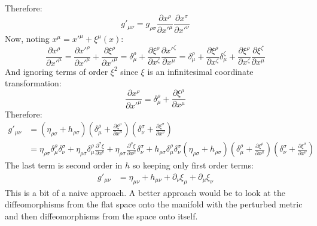 \documentclass[12pt,a4]{article}
\begin{document}
\begin{enumerate}
\begin{enumerate}
\begin{equation*}
        \end{equation*}
        Therefore:
        \begin{equation*}
          g'_{\mu\nu} = g_{\rho \sigma} \frac{\partial x^\rho}{\partial x'^\mu} \frac{\partial x^\sigma}{\partial x'^\nu} 
        \end{equation*}
        Now, noting $x^\mu = x'^\mu + \xi^\mu(x)$:
        \begin{equation*}
          \frac{\partial x^\rho}{\partial x'^\mu} = \frac{\partial x'^\rho}{\partial x'^\mu} + \frac{\partial \xi^\rho}{\partial x'^\mu} = \delta^\rho_\mu + \frac{\partial \xi^\rho}{\partial x^\zeta} \frac{\partial x'^\zeta}{\partial x^\mu} = \delta^\rho_\mu + \frac{\partial \xi^\rho}{\partial x^\zeta} \delta^\zeta_\mu + \frac{\partial \xi^\rho}{\partial x^\zeta}\frac{\partial\xi^\zeta}{\partial x^\mu} 
        \end{equation*}
        And ignoring terms of order $\xi^2$ since $\xi$ is an infinitesimal coordinate transformation:
        \begin{equation*}
          \frac{\partial x^\rho}{\partial x'^\mu} = \delta^\rho_\mu + \frac{\partial \xi^\rho}{\partial x^\mu} 
        \end{equation*}
        Therefore:
        \begin{align*}
          g'_{\mu\nu} &= \left(\eta_{\rho \sigma} + h_{\rho \sigma }\right) \left(\delta^\rho_\mu + \frac{\partial \xi^\rho}{\partial x^\mu}\right) \left(\delta^\sigma_\nu + \frac{\partial \xi^\sigma}{\partial x^\nu}\right)\\
                      &= \eta_{\rho \sigma} \delta^\rho_\mu \delta^\sigma_\nu + \eta_{\rho \sigma} \delta^\rho_\mu \frac{\partial^\sigma \xi}{\partial x^\nu} + \eta_{\rho \sigma} \frac{\partial^\rho \xi}{\partial x^\mu} \delta^\sigma_\nu + h_{\rho\sigma}\delta^\rho_\mu\delta^\sigma_\nu\left(\eta_{\rho \sigma} + h_{\rho \sigma }\right) \left(\delta^\rho_\mu + \frac{\partial \xi^\rho}{\partial x^\mu}\right) \left(\delta^\sigma_\nu + \frac{\partial \xi^\sigma}{\partial x^\nu}\right)
        \end{align*}
        The last term is second order in $h$ so keeping only first order terms:
        \begin{align*}
          g'_{\mu\nu} &= \eta_{\mu\nu} + h_{\mu\nu} + \partial_\nu \xi_\mu + \partial _\mu \xi_\nu 
        \end{align*}
        This is a bit of a naive approach.
        A better approach would be to look at the diffeomorphisms from the flat space onto the manifold with the perturbed metric and then diffeomorphisms from the space onto itself.

\end{enumerate}
\end{enumerate}
\end{document}
